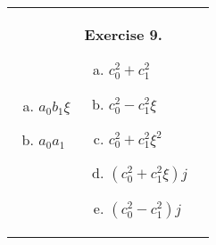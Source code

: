 \documentclass[../lecture-notes-148x210.tex]{subfiles}
\begin{document}
\begin{center}
\begin{tabular}{p{4.5cm}p{3cm}p{4cm}}
\begin{enumerate}[a)]
            \item $a_0b_1\xi$
            \item $a_0a_1$
        \end{enumerate} & 
        \textbf{Exercise 9.}
        \begin{enumerate}[a)]
            \item $c_0^2+c_1^2$
            \item $c_0^2-c_1^2\xi$
            \item $c_0^2+c_1^2\xi^2$
            \item $(c_0^2+c_1^2\xi)j$
            \item $(c_0^2-c_1^2)j$
        \end{enumerate} 
    \end{tabular}
\end{center}
\end{document}
